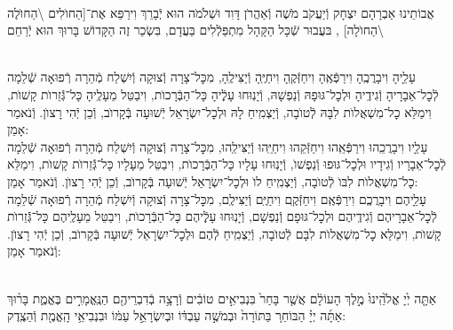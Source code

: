\documentclass[twoside, openany, parskip=half, 11pt]{book}
\begin{document}
\begin{sometimes}
\\
 אֲבוֹתֵינוּ אַבְרָהָם יִצְחָק וְֿיַעֲקֹב מֹשֶׁה וְֿאַהֲרֹן דָּוִד וּשְׁלֹמֹה הוּא יְֿבָרֵךְ וִירַפֵּא אֶת־[הַחוׂלִים \textbackslash הַחוׂלֶה \textbackslash הַחוׂלָה]
,
בּעֲבוּר שְֿׁכָּל הַקָּהָל מִתְפַּלְֿלִים בַּעֲדָם, בִּשְׂכַר זֶה
 הַקָּדוֹשׁ בָּרוּךְ הוּא יְֿרַחֵם
\setcolumnwidth{1.4in,1.4in,1.4in}
 \begin{paracol}{3}
 \\
 עָלֵָיהָ וִיבָרֲכֶֽהָ וִירַפְּֿאֶֽהָ וִיחַזְּֿקֶֽהָ וִיחַיֶּֽהָ וְֿיַצִּילֶֽהָ, מִכׇּל־צָרָה וְֿצוּקָה וְֿיִשְׁלַח מְֿהֵרָה רְֿפוּאָה שְֿׁלֵמָה לְֿכׇל־אֵבָרָיהָ וְֿגִידֶֽיהָ וּלְכׇל־גּוּפָהּ וְֿנַפְשָׁהּ, וְֿיָנֽוּחוּ עָלְֶֿיהָ כָּל־הַבְּֿרָכוׂת, וִיבַטֵּל מֵעָלֶֽיהָ כָּל־גְּֿֿזֵרוׂת קָשׁוׂת, וִימַלֵּא כׇל־מִשְׁאֲלוׂת לִבָּהּ לְֿטוׂבָה, וְֿיַצְמִֽיחַ לָהּ וּלְכׇל־יִשְׂרָאֵל יְֿשׁוּעָה בְּֿקָרוׂב, וְֿכֵן יְֿהִי רָצוׂן. וְֿנֹאמַר אָמֵן:
 \switchcolumn
 \\
עָלֵָיו וִיבָרֲכֵֽהוּ וִירַפְּֿאֵֽהוּ וִיחַזְּֿקֵהוּ וִיחַיֵּֽהוּ וְֿיַצִּילֵֽהוּ, מִכׇּל־צָרָה וְֿצוּקָה וְֿיִשְׁלַח מְֿהֵרָה רְֿפוּאָה שְֿׁלֵמָה לְֿכׇל־אֵבָרָיו וְֿגִידָיו וּלְכׇל־גּוּפוּ וְֿנַפְשׁוׂ, וְֿיָנֽוּחוּ עָלָיו כָּל־הַבְּֿרָכוׂת, וִיבַטֵּל מֵעָלָיו כָּל־גְּֿֿזֵרוׂת קָשׁוׂת, וִימַלֵּא כׇל־מִשְׁאֲלוׂת לִבּוׂ לְֿטוׂבָה, וְֿיַצְמִֽיחַ לוׂ וּלְכׇל־יִשְׂרָאֵל יְֿשׁוּעָה בְּֿקָרוׂב, וְֿכֵן יְֿהִי רָצוׂן. וְֿנֹאמַר אָמֵן:
 \switchcolumn
 \\
 עָלֵָיהֶם וִיבָרֲכְֶם וִירַפְּֿאֶֽם וִיחַזְּֿקֶֽם וִיחַיֶּֽם וְֿיַצִּילֶֽם, מִכׇּל־צָרָה וְֿצוּקָה וְֿיִשְׁלַח מְֿהֵרָה רְֿפוּאָה שְֿׁלֵמָה לְֿכׇל־אֵבָרָיהֶם וְֿגִידֶֽיהֶם וּלְכׇל־גּוּפָם וְֿנַפְשָׁם, וְֿיָנֽוּחוּ עָלְֶֿיהֶם כָּל־הַבְּֿרָכוׂת, וִיבַטֵּל מֵעָלֶֽיהֶם כָּל־גְּֿֿזֵרוׂת קָשׁוׂת, וִימַלֵּא כׇל־מִשְׁאֲלוׂת לִבָּם לְֿטוׂבָה, וְֿיַצְמִֽיחַ לְֿהֶם וּלְכׇל־יִשְׂרָאֵל יְֿשׁוּעָה בְּֿקָרוׂב, וְֿכֵן יְֿהִי רָצוׂן. וְֿנֹאמַר אָמֵן:
 \end{paracol}

\end{sometimes}

\halfkaddish

\hagbaha

\galila


\\
 אַתָּ֤ה יְ֙יָ אֱלֹ֙הֵֽינוּ֙ מֶ֣לֶךְ הָעוֹלָ֔ם אֲשֶׁ֤ר בָּחַר֙ בִּנְבִיאִ֣ים טוֹבִ֔ים וְֿרָצָ֥ה בְֿדִבְרֵיהֶ֖ם הַנֶּֽאֱמָרִ֣ים בֶּאֱמֶ֑ת בָּר֨וּךְ אַתָּ֜ה יְיָ֗ הַבּוֹחֵר֚ בַּתּוֹרָה֙ וּבְמֹשֶׁ֣ה עַבְדּ֔וֹ וּבְיִשְׂרָאֵ֣ל עַמּ֔וֹ וּבִנְבִיאֵ֥י הָֽאֱמֶ֖ת וְֿהַצֶֽדֶק:
\end{document}
